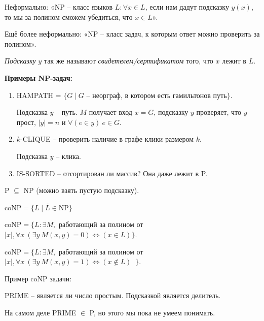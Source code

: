 Неформально: «NP – класс языков $L:\forall x\in L$, если нам дадут подсказку $y(x)$, то мы за полином сможем убедиться, что $x\in L$».

Ещё более неформально: «NP $–$ класс задач, к которым ответ можно проверить за полином».

\textit{Подсказку} $y$ так же называют \textit{свидетелем/сертификатом} того, что $x$ лежит в $L$.

\begin{example}
    \textbf{Примеры NP-задач:}
    \begin{enumerate}
        \item HAMPATH = $\{G\mid G$ – неорграф, в котором есть гамильтонов путь$\}$.

        Подсказка $y$ – путь. $M$ получает вход $x=G$, подсказку $y$ проверяет, что $y$ прост, $|y|=n$ и $\forall (e\in y)\ e\in G$.
        \item $k$-CLIQUE – проверить наличие в графе клики размером $k$.

        Подсказка $y$ – клика.
        \item IS-SORTED – отсортирован ли массив? Она даже лежит в P.
    \end{enumerate}
\end{example}

\begin{remark}
    P $\subseteq$ NP (можно взять пустую подсказку).
\end{remark}

\begin{definition}
    coNP$=\{L\mid \overline{L}\in $NP$\}$
\end{definition}

\begin{definition}
    coNP$ = \{L: \exists M,$ работающий за полином от $|x|, \forall x\ (\exists y \ M(x,y)=0)\Leftrightarrow (x\in L)\}$.
\end{definition}

\begin{definition}
    coNP$ = \{L: \exists M,$ работающий за полином от $|x|, \forall x\ (\exists y \ M(x,y)=1)\Leftrightarrow (x\notin L)︀\}$.
\end{definition}

\begin{example}
    Пример coNP задачи:

    PRIME – является ли число простым. Подсказкой является делитель.

    На самом деле PRIME $\in$ P, но этого мы пока не умеем понимать.
\end{example}

